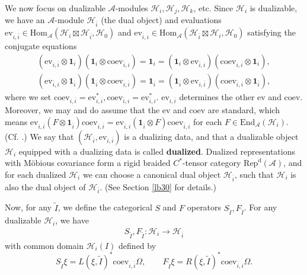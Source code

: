\documentclass[12pt,a4paper]{article}
\theoremstyle{definition}
\theoremstyle{plain}
\newcommand{\mc}{\mathcal}
\newcommand{\wtd}{\widetilde}
\newcommand{\ovl}{\overline}
\newcommand{\End}{\mathrm{End}} %
\newcommand{\id}{\mathbf{1}}
\newcommand{\Hom}{\mathrm{Hom}}
\newcommand{\ev}{\mathrm{ev}}
\newcommand{\coev}{\mathrm{coev}}
\newcommand{\RepdA}{\mathrm{Rep}^{\mathrm d}(\mc A)}
\numberwithin{equation}{section}
\begin{document}
We now focus on dualizable $\mc A$-modules $\mc H_i,\mc H_j,\mc H_k$, etc. Since $\mc H_i$ is dualizable, we have an $\mc A$-module $\mc H_{\ovl i}$ (the dual object) and evaluations $\ev_{i,\ovl i}\in\Hom_{\mc A}(\mc H_i\boxtimes\mc H_{\ovl i},\mc H_0)$ and $\ev_{\ovl i,i}\in\Hom_{\mc A}(\mc H_{\ovl i}\boxtimes\mc H_i,\mc H_0)$  satisfying the conjugate equations
\begin{gather*}
(\ev_{i,\ovl i}\otimes\id_i)(\id_i\otimes\coev_{\ovl i,i})=\id_i=(\id_i\otimes\ev_{\ovl i,i})(\coev_{i,\ovl i}\otimes\id_i),\\
(\ev_{\ovl i,i}\otimes\id_{\ovl i})(\id_{\ovl i}\otimes\coev_{i,\ovl i})=\id_{\ovl i}=(\id_{\ovl i}\otimes\ev_{i,\ovl i})(\coev_{\ovl i,i}\otimes\id_{\ovl i}),
\end{gather*}
where we set $\coev_{i,\ovl i}=\ev_{i,\ovl i}^*,\coev_{\ovl i,i}=\ev_{\ovl i,i}^*$. $\ev_{i,\ovl i}$ determines the other $\ev$ and $\coev$. Moreover, we may and do assume that the $\ev$ and $\coev$ are standard, which means $\ev_{i,\ovl i}(F\otimes\id_{\ovl i})\coev_{i,\ovl i}=\ev_{\ovl i,i}(\id_{\ovl i}\otimes F)\coev_{\ovl i,i}$ for each $F\in\End_{\mc A}(\mc H_i)$. (Cf. \cite{LR97,Yam04,BDH14}.) We say that $(\mc H_{\ovl i},\ev_{i,\ovl i})$ is a dualizing data, and that a dualizable object $\mc H_i$ equipped with a dualizing data is called \textbf{dualized}. Dualized representations with M\"obious covariance form a rigid braided $C^*$-tensor category $\RepdA$, and for each dualized $\mc H_i$ we can choose a canonical dual object $\mc H_{\ovl i}$, such that $\mc H_i$ is also the dual object of $\mc H_{\ovl i}$. (See Section \ref{lb30} for details.) 

Now, for any $\wtd I$, we define the categorical $S$ and $F$ operators $S_{\wtd I},F_{\wtd I}$. For any dualizable $\mc H_i$, we have 
\begin{align*}
S_{\wtd I},F_{\wtd I}:\mc H_i\rightarrow\mc H_{\ovl i}
\end{align*} 
with common domain $\mc H_i(I)$ defined by
\begin{equation*}
S_{\wtd I}\xi=L(\xi,\wtd I)^*\coev_{i,\ovl i}\Omega,\qquad F_{\wtd I}\xi=R(\xi,\wtd I)^*\coev_{\ovl i,i}\Omega.
\end{equation*}
\end{document}

